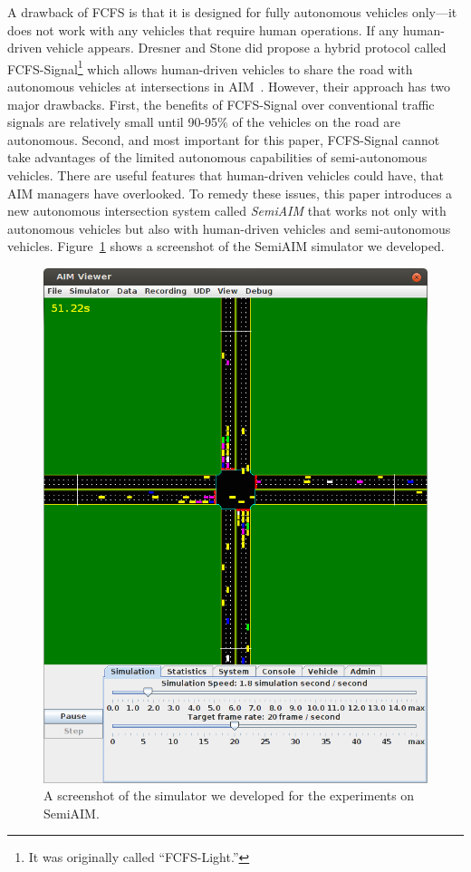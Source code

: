 A drawback of FCFS is that it is designed for fully autonomous
vehicles only---it does not work with any vehicles that require
human operations. If any human-driven vehicle
appears. Dresner and Stone did propose a hybrid protocol called
FCFS-Signal\footnote{It was originally called ``FCFS-Light.''} which
allows human-driven vehicles to share the road with autonomous
vehicles at intersections in AIM~\cite{bib:Dresner07Sharing}. However,
their approach has two major drawbacks.  First, the benefits of
FCFS-Signal over conventional traffic signals are relatively small
until 90-95\% of the vehicles on the road are autonomous.  Second, and
most important for this paper, FCFS-Signal cannot take advantages of
the limited autonomous capabilities of semi-autonomous vehicles. There
are useful features that human-driven vehicles could have, that AIM
managers have overlooked. To remedy these issues, this paper
introduces a new autonomous intersection system called \emph{SemiAIM}
that works not only with autonomous vehicles but also with
human-driven vehicles and semi-autonomous vehicles.
Figure~\ref{fig:demo} shows a screenshot of the SemiAIM simulator
we developed. 

\begin{figure}
\centering
\includegraphics[width=0.8\columnwidth]{figures/demo.png}
\caption{A screenshot of the simulator we developed for the experiments on
SemiAIM.}
\label{fig:demo}
\end{figure}

